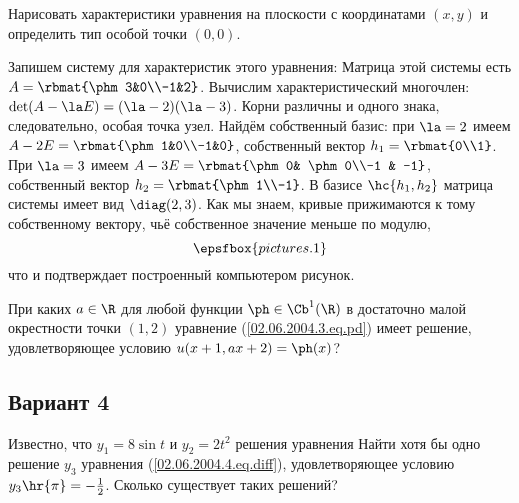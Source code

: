 \documentclass{article}
\begin{document}
\begin{problem}[2 балла]
Нарисовать характеристики уравнения
на плоскости с координатами $(x,y)$ и определить тип особой точки $(0,0)$.
\end{problem}
\begin{solution}
Запишем систему для характеристик этого уравнения:
Матрица этой системы есть $A = \rbmat{\phm 3&0\\-1&2}$. Вычислим характеристический многочлен:
$\det (A-\la E) = (\la -2)(\la-3)$. Корни различны и одного знака, следовательно, особая точка узел.
Найдём собственный базис: при $\la = 2$ имеем $A - 2E = \rbmat{\phm 1&0\\-1&0}$, собственный вектор $h_1 = \rbmat{0\\1}$.
При $\la = 3$ имеем $A - 3E = \rbmat{\phm 0& \phm 0\\-1 & -1}$, собственный вектор $h_2 = \rbmat{\phm 1\\-1}$.
В базисе $\hc{h_1,h_2}$ матрица системы имеет вид $\diag(2,3)$.
Как мы знаем, кривые прижимаются к тому собственному вектору, чьё собственное значение меньше по модулю,
$$
  \epsfbox{pictures.1}
$$
что и подтверждает построенный компьютером рисунок.
\end{solution}



\begin{problem}[3 балла]
  При каких $a \in \R$ для любой функции $\ph \in  \Cb^1(\R)$ в достаточно малой
  окрестности точки $(1,2)$ уравнение (\ref{02.06.2004.3.eq.pd}) имеет решение, удовлетворяющее
  условию $u(x+1,ax+2) = \ph(x)$?
\end{problem}


\setcounter{problem}{0}
\subsection{Вариант 4}

\begin{problem}[3 балла]
Известно, что $y_1=8\sin t$ и $y_2 = 2t^2$ решения уравнения
Найти хотя бы одно решение $y_3$ уравнения (\ref{02.06.2004.4.eq.diff}), удовлетворяющее
условию $y_3\hr{\pi} = -\frac12$. Сколько существует таких решений?
\end{problem}
\end{document}
